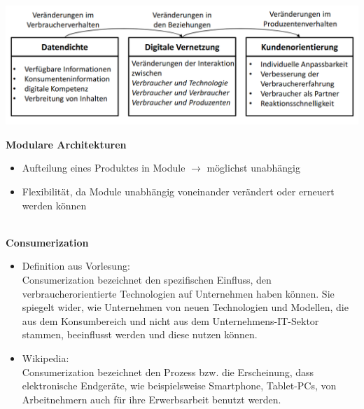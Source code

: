\documentclass[a4]{scrartcl}
\begin{document}
\includegraphics[scale=0.3]{prozess.png}



\textbf{Modulare Architekturen}

\begin{itemize}
\item Aufteilung eines Produktes in Module $\rightarrow$ möglichst unabhängig
\item Flexibilität, da Module unabhängig voneinander verändert oder erneuert werden können
\end{itemize}

\ \\

\textbf{Consumerization}
\begin{itemize}
\item Definition aus Vorlesung: \\
Consumerization bezeichnet den spezifischen Einfluss, den verbraucherorientierte Technologien auf Unternehmen haben können. Sie spiegelt wider, wie Unternehmen von neuen Technologien und Modellen, die aus dem Konsumbereich und nicht aus dem Unternehmens-IT-Sektor stammen, beeinflusst werden und diese nutzen können.
\item Wikipedia: \\
Consumerization bezeichnet den Prozess bzw. die Erscheinung, dass elektronische Endgeräte, wie beispielsweise Smartphone, Tablet-PCs, von Arbeitnehmern auch für ihre Erwerbsarbeit benutzt werden.
\end{itemize}
\end{document}
